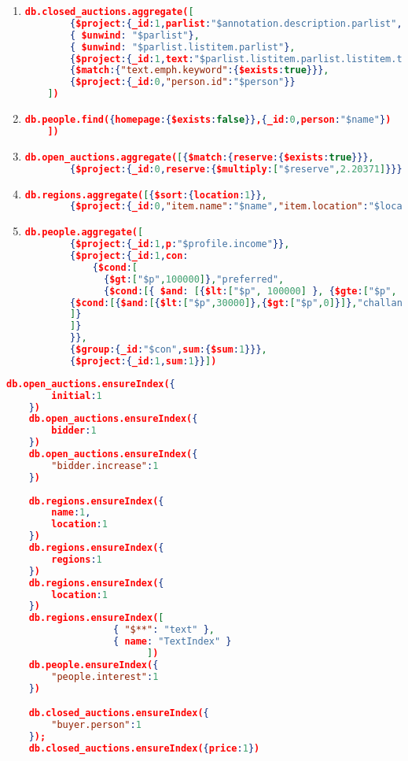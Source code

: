 \begin{enumerate}[label=Q\arabic*.]
    \item %
	\begin{lstlisting}[language=JSON,   basicstyle=\scriptsize]
	  db.closed_auctions.aggregate([
		{$project:{_id:1,parlist:"$annotation.description.parlist",person:"$seller.person"}},
		{ $unwind: "$parlist"},
		{ $unwind: "$parlist.listitem.parlist"},
		{$project:{_id:1,text:"$parlist.listitem.parlist.listitem.text",person:1}},
		{$match:{"text.emph.keyword":{$exists:true}}},
		{$project:{_id:0,"person.id":"$person"}}
	])
	\end{lstlisting}	

    \item %
	\begin{lstlisting}[language=JSON,   basicstyle=\scriptsize]
	  db.people.find({homepage:{$exists:false}},{_id:0,person:"$name"})
	])
	\end{lstlisting}	

    \item %
	\begin{lstlisting}[language=JSON,   basicstyle=\scriptsize]
	  db.open_auctions.aggregate([{$match:{reserve:{$exists:true}}},
		{$project:{_id:0,reserve:{$multiply:["$reserve",2.20371]}}}])
	\end{lstlisting}	

    \item %
	\begin{lstlisting}[language=JSON,   basicstyle=\scriptsize]
	  db.regions.aggregate([{$sort:{location:1}},
		{$project:{_id:0,"item.name":"$name","item.location":"$location"}}])
	\end{lstlisting}	
    
    \item %
	\begin{lstlisting}[language=JSON,   basicstyle=\scriptsize]
	  db.people.aggregate([
		{$project:{_id:1,p:"$profile.income"}},
		{$project:{_id:1,con:
			{$cond:[
			  {$gt:["$p",100000]},"preferred",
			  {$cond:[{ $and: [{$lt:["$p", 100000] }, {$gte:["$p", 30000] }] },"standard",
		{$cond:[{$and:[{$lt:["$p",30000]},{$gt:["$p",0]}]},"challange","na"]}
		]}
		]}
		}},
		{$group:{_id:"$con",sum:{$sum:1}}},
		{$project:{_id:1,sum:1}}])
	\end{lstlisting}
\end{enumerate}
\noindent\makebox[\linewidth]{\rule{\paperwidth}{0.4pt}}
\begin{lstlisting}[language=JSON,   basicstyle=\scriptsize, label=mongodb-xmark-index, caption=Secondary indexes in MongoDB's XMark data]
	  db.open_auctions.ensureIndex({
		initial:1
	})
	db.open_auctions.ensureIndex({
		bidder:1
	})
	db.open_auctions.ensureIndex({
		"bidder.increase":1
	})
	
	db.regions.ensureIndex({
		name:1,
		location:1
	})
	db.regions.ensureIndex({
		regions:1
	})
	db.regions.ensureIndex({
		location:1
	})
	db.regions.ensureIndex([
                   { "$**": "text" },
                   { name: "TextIndex" }
                         ])
	db.people.ensureIndex({
		"people.interest":1
	})

	db.closed_auctions.ensureIndex({
		"buyer.person":1
	});
	db.closed_auctions.ensureIndex({price:1})
	\end{lstlisting}
